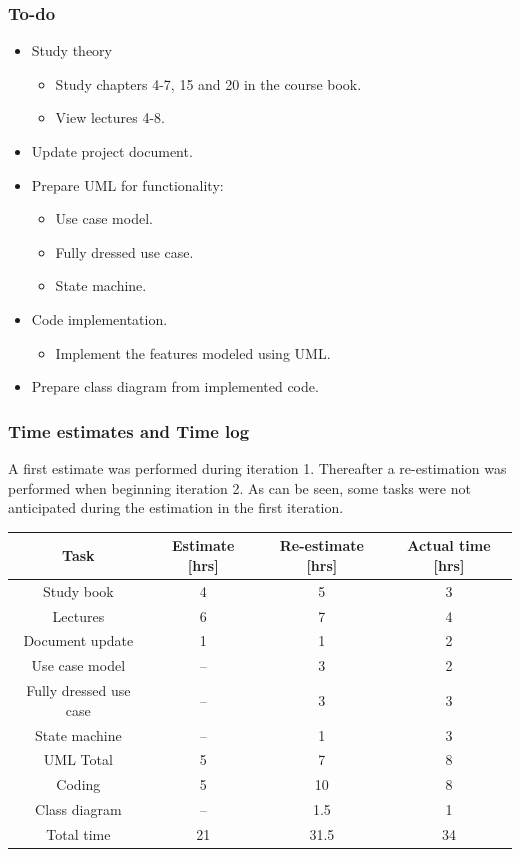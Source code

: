 \documentclass[12pt, letterpaper]{article}
\begin{document}
\subsubsection{To-do}
\begin{itemize}
	\item Study theory
	\begin{itemize}
		\item Study chapters 4-7, 15 and 20 in the course book.
		\item View lectures 4-8.
	\end{itemize}
	\item Update project document.
	\item Prepare UML for functionality:
	\begin{itemize}
		\item Use case model.
		\item Fully dressed use case.
		\item State machine.
	\end{itemize}
	\item Code implementation.
	\begin{itemize}
		\item Implement the features modeled using UML.
	\end{itemize}
	\item Prepare class diagram from implemented code. 
\end{itemize}
\subsubsection{Time estimates and Time log}
A first estimate was performed during iteration 1. Thereafter a re-estimation was performed when beginning iteration 2. As can be seen, some tasks were not anticipated during the estimation in the first iteration.
\begin{center}
	\begin{tabular}{|c|c|c|c|} 
		\hline
		Task & Estimate [hrs] & Re-estimate [hrs] & Actual time [hrs] \\ [0.5ex] 
		\hline\hline
		Study book & 4 & 5 & 3\\
		\hline
		Lectures & 6 & 7 & 4\\
		\hline 
		Document update & 1 & 1 & 2 \\
		\hline 
		Use case model & -- & 3 & 2 \\
		\hline
		Fully dressed use case & -- & 3 & 3\\
		\hline
		State machine & -- & 1 & 3 \\
		\hline
		UML Total & 5 & 7 & 8 \\
		\hline
		Coding & 5 & 10 & 8 \\ 
		\hline
		Class diagram & -- & 1.5 & 1\\
		\hline
		Total time & 21 & 31.5 & 34\\ [1ex]
		\hline 
	\end{tabular}
\end{center}
\end{document}
